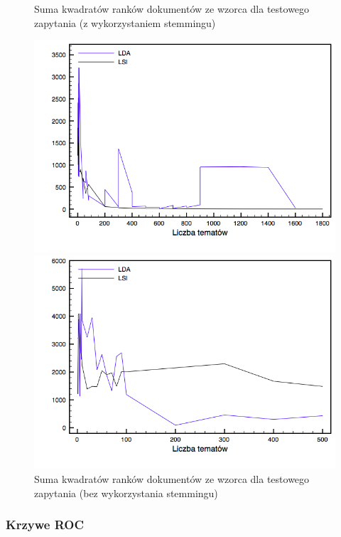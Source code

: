 \documentclass[11pt,a4paper]{article}
\begin{document}
\begin{figure}[h]
\caption{Suma kwadratów ranków dokumentów ze wzorca dla testowego zapytania (z wykorzystaniem stemmingu)}
\label{ranks_stemming_comparison}
\includegraphics[width=\linewidth]{gfx/ranks_stemming.png}

\caption{Suma kwadratów ranków dokumentów ze wzorca dla testowego zapytania (bez wykorzystania stemmingu)}
\label{ranks_no_stemming_comparison}
\includegraphics[width=\linewidth]{gfx/ranks_no_stemming.png}
\end{figure}

\FloatBarrier

\subsubsection{Krzywe ROC}
\end{document}
